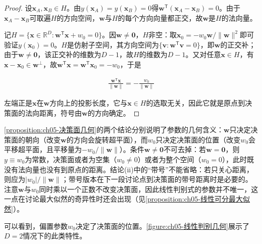 \documentclass[../../main.tex]{subfiles}
\begin{document}
\begin{proof}
设$\boldsymbol{x}_A,\boldsymbol{x}_B\in H$。由$y(\boldsymbol{x}_A)=y(\boldsymbol{x}_B)=0$得$\boldsymbol{w}^{\mathsf{T}}(\boldsymbol{x}_A-\boldsymbol{x}_B)=0$。由于$\boldsymbol{x}_A-\boldsymbol{x}_B$可取遍$H$的方向空间，$\boldsymbol{w}$与$H$的每个方向向量都正交，故$\boldsymbol{w}$是$H$的法向量。

记$H=\{\boldsymbol{x}\in\mathbb{R}^{D}:\boldsymbol{w}^{\mathsf{T}}\boldsymbol{x}+w_0=0\}$。因$\boldsymbol{w}\neq\boldsymbol{0}$，$H$非空：取$\boldsymbol{x}_0=-w_0\boldsymbol{w}/\lVert\boldsymbol{w}\rVert^{2}$即可验证$y(\boldsymbol{x}_0)=0$。$H$是仿射子空间，其方向空间为$\{\boldsymbol{v}:\boldsymbol{w}^{\mathsf{T}}\boldsymbol{v}=0\}$，即$\boldsymbol{w}$的正交补；由于$\boldsymbol{w}\neq\boldsymbol{0}$，该正交补的维数为$D-1$，故$H$的维数为$D-1$。又对任意$\boldsymbol{x}\in H$，有$\boldsymbol{x}-\boldsymbol{x}_0\in\boldsymbol{w}^{\perp}$，故$\boldsymbol{w}^{\mathsf{T}}\boldsymbol{x}=\boldsymbol{w}^{\mathsf{T}}\boldsymbol{x}_0=-w_0$，于是

\begin{align}
  \frac{\boldsymbol{w}^{\mathsf{T}}\boldsymbol{x}}{\lVert\boldsymbol{w}\rVert}=-\frac{w_0}{\lVert\boldsymbol{w}\rVert}
\end{align}

左端正是$\boldsymbol{x}$在$\boldsymbol{w}$方向上的投影长度，它与$\boldsymbol{x}\in H$的选取无关，因此它就是原点到决策面的法向距离，符号由$\boldsymbol{w}$的方向确定。
\end{proof}

\begin{remark}
\cref{proposition:ch05-决策面几何}的两个结论分别说明了参数的几何含义：$\boldsymbol{w}$只决定决策面的朝向（改变$\boldsymbol{w}$的方向会旋转超平面），而$w_0$只决定决策面的位置（改变$w_0$会平移超平面，且平移量为$-w_0/\lVert\boldsymbol{w}\rVert$）。条件$\boldsymbol{w}\neq\boldsymbol{0}$不可去掉：若$\boldsymbol{w}=\boldsymbol{0}$，则$y\equiv w_0$为常数，决策面或者为空集（$w_0\neq0$）或者为整个空间（$w_0=0$），此时既没有法向量也没有到原点的距离。结论(ii)中的“带号”不能省略：若只关心距离，则应为$|w_0|/\lVert\boldsymbol{w}\rVert$；带号版本在下一段讨论点到决策面的带号距离时是必要的。注意$\boldsymbol{w}$与$w_0$同时乘以一个正数不改变决策面，因此线性判别式的参数并不唯一，这一点在讨论最大似然的奇异性时还会出现（见\cref{proposition:ch05-线性可分最大似然}）。
\end{remark}

可以看到，偏置参数$w_0$决定了决策面的位置。\cref{figure:ch05-线性判别几何}展示了$D=2$情况下的此类特性。
\end{document}
